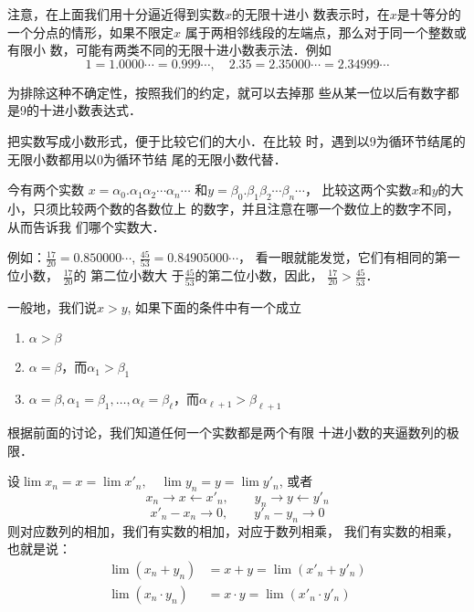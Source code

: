     注意，在上面我们用十分逼近得到实数$x$的无限十进小
    数表示时，在$x$是十等分的一个分点的情形，如果不限定$x$
    属于两相邻线段的左端点，那么对于同一个整数或有限小
    数，可能有两类不同的无限十进小数表示法．例如
\[1=1.0000\cdots=0.999\cdots,\quad 2.35=2.35000\cdots=2.34999\cdots\]

    为排除这种不确定性，按照我们的约定，就可以去掉那
    些从某一位以后有数字都是9的十进小数表达式．

把实数写成小数形式，便于比较它们的大小．在比较
时，遇到以9为循环节结尾的无限小数都用以0为循环节结
尾的无限小数代替．

今有两个实数
$x=\alpha_0.\alpha_1\alpha_2\cdots\alpha_n\cdots$ 和$y=\beta_0.\beta_1\beta_2\cdots\beta_n\cdots$，
比较这两个实数$x$和$y$的大小，只须比较两个数的各数位上
的数字，并且注意在哪一个数位上的数字不同，从而告诉我
们哪个实数大．


例如：$\frac{17}{20}=0.850000\cdots$, $\frac{45}{53}=0.84905000\cdots$，
看一眼就能发觉，它们有相同的第一位小数，
$\frac{17}{20}$的 第二位小数大
于$\frac{45}{53}$的第二位小数，因此，
$\frac{17}{20}>\frac{45}{53}$．

一般地，我们说$x>y$, 如果下面的条件中有一个成立
\begin{enumerate}
    \item $\alpha>\beta$
    \item $\alpha=\beta$，而$\alpha_1>\beta_1$
    \item $\alpha=\beta, \alpha_1 =\beta_1,\ldots,\alpha_{\ell}=\beta_{\ell}$，而$\alpha_{\ell+1}>\beta_{\ell+1}$
\end{enumerate}

根据前面的讨论，我们知道任何一个实数都是两个有限
十进小数的夹逼数列的极限．

设$\lim x_n=x=\lim x'_n,\quad \lim y_n=y=\lim y'_n$,
或者
\[x_n\to x\leftarrow x'_n,\qquad y_n\to y\leftarrow y'_n\]
\[x'_n-x_n\to 0,\qquad y'_n-y_n\to 0\]
则对应数列的相加，我们有实数的相加，对应于数列相乘，
我们有实数的相乘，也就是说：
\[\begin{split}
    \lim(x_n+y_n)&=x+y=\lim(x'_n+y'_n)\\
    \lim(x_n\cdot y_n)&=x\cdot y=\lim(x'_n\cdot y'_n)
\end{split}
\]

